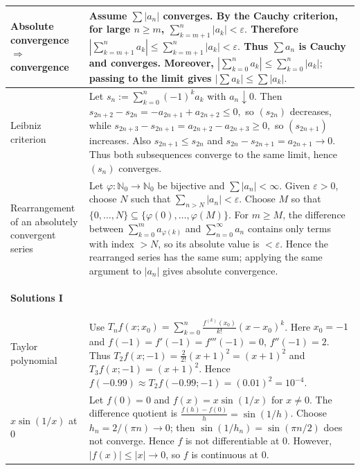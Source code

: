 {\begin{minipage}[t]{0.495\textwidth}
\begin{tabular}{
    @{}
    >{\bfseries\raggedright\arraybackslash}p{2.9cm}
    >{\raggedright\arraybackslash}p{10.5cm}
    @{}
}
\midrule

Absolute convergence $\Rightarrow$ convergence &
Assume
$
\sum |a_n|
$
converges. By the Cauchy criterion, for large $n\ge m$,
$
\sum_{k=m+1}^{n}|a_k|<\varepsilon.
$
Therefore
$
\left|\sum_{k=m+1}^{n}a_k\right|
\le
\sum_{k=m+1}^{n}|a_k|
<\varepsilon.
$
Thus $\sum a_n$ is Cauchy and converges. Moreover,
$
\left|\sum_{k=0}^{n}a_k\right|
\le
\sum_{k=0}^{n}|a_k|;
$
passing to the limit gives
$
\left|\sum a_k\right|\le\sum|a_k|.
$
\\

\midrule

Leibniz criterion &
Let
$
s_n:=\sum_{k=0}^{n}(-1)^ka_k
$
with $a_n\downarrow0$. Then
$
s_{2n+2}-s_{2n}=-a_{2n+1}+a_{2n+2}\le0,
$
so $(s_{2n})$ decreases, while
$
s_{2n+3}-s_{2n+1}=a_{2n+2}-a_{2n+3}\ge0,
$
so $(s_{2n+1})$ increases. Also
$
s_{2n+1}\le s_{2n}
$
and
$
s_{2n}-s_{2n+1}=a_{2n+1}\to0.
$
Thus both subsequences converge to the same limit, hence $(s_n)$ converges.
\\

\midrule

Rearrangement of an absolutely convergent series &
Let $\varphi:\mathbb N_0\to\mathbb N_0$ be bijective and
$
\sum|a_n|<\infty.
$
Given $\varepsilon>0$, choose $N$ such that
$
\sum_{n>N}|a_n|<\varepsilon.
$
Choose $M$ so that
$
\{0,\ldots,N\}
\subseteq
\{\varphi(0),\ldots,\varphi(M)\}.
$
For $m\ge M$, the difference between
$
\sum_{k=0}^{m}a_{\varphi(k)}
$
and
$
\sum_{n=0}^{\infty}a_n
$
contains only terms with index $>N$, so its absolute value is
$<\varepsilon$. Hence the rearranged series has the same sum; applying
the same argument to $|a_n|$ gives absolute convergence.
\\

\midrule


\textbf{\large Solutions I}\par
\\

\midrule

Taylor polynomial &
Use
$T_n f(x;x_0)=\sum_{k=0}^{n}
\frac{f^{(k)}(x_0)}{k!}(x-x_0)^k$.
Here $x_0=-1$ and
$f(-1)=f'(-1)=f'''(-1)=0$, $f''(-1)=2$.
Thus
$T_2f(x;-1)=\frac{2}{2!}(x+1)^2=(x+1)^2$
and
$T_3f(x;-1)=(x+1)^2$.
Hence
$f(-0.99)\approx T_2f(-0.99;-1)=(0.01)^2=10^{-4}$.
\\

\midrule

$x\sin(1/x)$ at $0$ &
Let $f(0)=0$ and $f(x)=x\sin(1/x)$ for $x\neq0$.
The difference quotient is
$\frac{f(h)-f(0)}h=\sin(1/h)$.
Choose $h_n=2/(\pi n)\to0$; then
$\sin(1/h_n)=\sin(\pi n/2)$ does not converge.
Hence $f$ is not differentiable at $0$.
However, $|f(x)|\le|x|\to0$, so $f$ is continuous at $0$.
\\


\end{tabular}
\end{minipage}}
